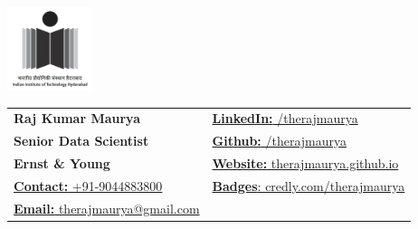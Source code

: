 \documentclass[a4paper,10pt]{article}
\begin{document}

\begin{table}
    \begin{minipage}{0.15\linewidth}
        \centering
        \includegraphics[width=25mm]{iith_logo_black.jpg}
    \end{minipage}
    \begin{minipage}{0.65\linewidth}
        \setlength{\tabcolsep}{30pt}
        \def\arraystretch{1.15}
        \begin{tabular}{ll}
            \textbf{Raj Kumar Maurya}  &  \href{https://www.linkedin.com/in/therajmaurya}{\textbf{LinkedIn:} /therajmaurya}\\
            \textbf{Senior Data Scientist} & 
            \href{https://github.com/therajmaurya}{\textbf{Github:} /therajmaurya}\\
            \textbf{Ernst \& Young} & 
            \href{https://therajmaurya.github.io}{\textbf{Website:} therajmaurya.github.io}\\
            \href{tel:+919044883800}{\textbf{Contact:} +91-9044883800} & \href{https://www.credly.com/users/therajmaurya/badges}{\textbf{Badges}: credly.com/therajmaurya}\\
            \href{mailto:therajmaurya@gmail.com}{\textbf{Email:} therajmaurya@gmail.com} & 
            {\textbf{}}
        \end{tabular}
    \end{minipage}\hfill
\end{table}    
\end{document}
